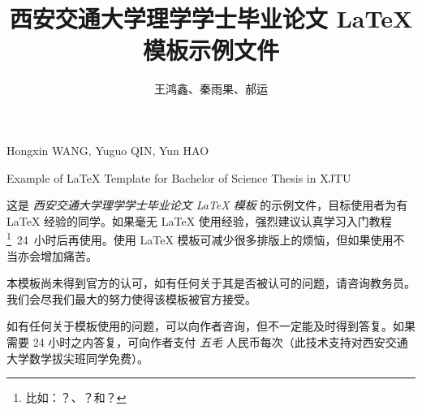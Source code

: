\documentclass[%
               print, 
               timesmath
              ]{xjtubsc}
\begin{document}

\author{王鸿鑫、秦雨果、郝运}{Hongxin WANG, Yuguo QIN, Yun HAO}	%
\title{西安交通大学理学学士毕业论文 \LaTeX{} 模板示例文件}{Example of \LaTeX{} Template for Bachelor of Science Thesis in XJTU}	%


\begin{INFObackground} %


\end{INFObackground}

\begin{INFOdata} %


\end{INFOdata}

\begin{INFOtask} %


\end{INFOtask}

\begin{INFOrequirement} %


\end{INFOrequirement}

\begin{INFOsubmit} %


\end{INFOsubmit}

\begin{INFOreference} %


\end{INFOreference}

\frontmatter


\begin{abstractcn} %
这是 \emph{西安交通大学理学学士毕业论文 \LaTeX{} 模板} 的示例文件，目标使用者为有 \LaTeX{} 经验的同学。如果毫无 \LaTeX{} 使用经验，强烈建议认真学习入门教程\footnote{比如：？、？和？}~24~小时后再使用。使用 LaTeX 模板可减少很多排版上的烦恼，但如果使用不当亦会增加痛苦。

本模板尚未得到官方的认可，如有任何关于其是否被认可的问题，请咨询教务员。我们会尽我们最大的努力使得该模板被官方接受。

如有任何关于模板使用的问题，可以向作者咨询，但不一定能及时得到答复。如果需要 24 小时之内答复，可向作者支付 \emph{五毛} 人民币每次（此技术支持对西安交通大学数学拔尖班同学免费）。

\end{abstractcn}
\end{document}
